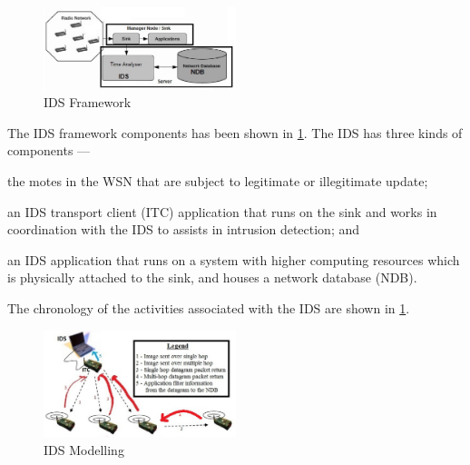 \documentclass[conference,manuscript]{IEEEtran}
\begin{document}
\begin{figure}[btp]
    \centering
    \includegraphics[width=0.5\textwidth]{IDS_fw}	
    \caption{IDS Framework}
    \label{fig:ids_fw}
\end{figure}
The IDS framework components has been shown in \ref{fig:ids_fw}.
The IDS has three kinds of components --- 
\begin{inparaenum}
\item the motes in the WSN that are subject to legitimate or illegitimate update; 
\item an IDS transport client (ITC) application that runs on the sink and works in coordination with the IDS to assists in intrusion detection; and
\item an IDS application that runs on a system with higher computing resources which is physically attached to the sink, and houses a network database (NDB).
\end{inparaenum}
The chronology of the activities associated with the IDS  are shown in  \ref{fig:ids_fw}.
\begin{figure}[btp]
    \centering
    \includegraphics[width=0.5\textwidth]{IDS}
    \caption{IDS Modelling}
    \label{fig:ids_model}
\end{figure}
\end{document}
